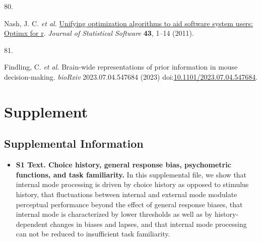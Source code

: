 \documentclass[
]{article}
\newlength{\cslhangindent}
\newlength{\csllabelwidth}
\newlength{\cslentryspacingunit} %
\newenvironment{CSLReferences}[2] %
 {%
  \setlength{\parindent}{0pt}
  \ifodd #1
  \let\oldpar\par
  \def\par{\hangindent=\cslhangindent\oldpar}
  \fi
  \setlength{\parskip}{#2\cslentryspacingunit}
 }%
 {}
\newcommand{\CSLLeftMargin}[1]{\parbox[t]{\csllabelwidth}{#1}}
\newcommand{\CSLRightInline}[1]{\parbox[t]{\linewidth - \csllabelwidth}{#1}\break}
\begin{document}
\begin{CSLReferences}{0}{0}
\leavevmode{}%
\CSLLeftMargin{80. }%
\CSLRightInline{Nash, J. C. \emph{et al.}
\href{https://doi.org/10.18637/JSS.V043.I09}{Unifying optimization
algorithms to aid software system users: Optimx for r}. \emph{Journal of
Statistical Software} \textbf{43}, 1--14 (2011).}

\leavevmode{}%
\CSLLeftMargin{81. }%
\CSLRightInline{Findling, C. \emph{et al.} Brain-wide representations of
prior information in mouse decision-making. \emph{bioRxiv}
2023.07.04.547684 (2023)
doi:\href{https://doi.org/10.1101/2023.07.04.547684}{10.1101/2023.07.04.547684}.}

\end{CSLReferences}

\newpage
\hypertarget{Supplement}{%
\section*{Supplement}\label{Supplement}}

\subsection*{{Supplemental Information}\label{Supplemental Information}}

\begin{itemize}
\item \textbf{S1 Text. Choice history, general response bias, psychometric functions, and task familiarity.} In this supplemental file, we show that internal mode processing is driven by choice history as opposed to stimulus history, that fluctuations between internal and external mode modulate perceptual performance beyond the effect of general response biases, that internal mode is characterized by lower thresholds as well as by history-dependent changes in biases and lapses, and that internal mode processing can not be reduced to insufficient task familiarity.
\end{itemize}
 
\end{document}

